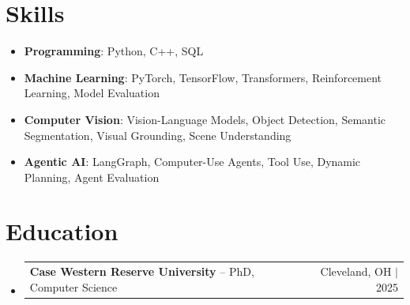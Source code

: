 \documentclass[letterpaper,13pt]{article}
\makeatletter
\newcommand{\resumeProjectHeading}[2]{
    \item
    \begin{tabular*}{\textwidth}{l@{\extracolsep{\fill}}r}
      \small#1 & #2 \\
    \end{tabular*}\vspace{-4pt}
}
\newcommand{\resumeSubHeadingListStart}{\begin{itemize}[leftmargin=0in, label={}]}
\newcommand{\resumeSubHeadingListEnd}{\end{itemize}}
\makeatother
\begin{document}
\section{Skills}
\vspace{0.02cm}
\begin{itemize}[leftmargin=0.15in, label={}, itemsep=2pt, topsep=1pt]
  \item \textbf{Programming}: Python, C++, SQL
  \item \textbf{Machine Learning}: PyTorch, TensorFlow, Transformers, Reinforcement Learning, Model Evaluation
  \item \textbf{Computer Vision}: Vision-Language Models, Object Detection, Semantic Segmentation, Visual Grounding, Scene Understanding
  \item \textbf{Agentic AI}: LangGraph, Computer-Use Agents, Tool Use, Dynamic Planning, Agent Evaluation
\end{itemize}
\vspace{0.02cm}

\section{Education}
\resumeSubHeadingListStart
  \resumeProjectHeading{\textbf{Case Western Reserve University} -- PhD, Computer Science}{Cleveland, OH $|$ 2025}
\resumeSubHeadingListEnd
\end{document}
